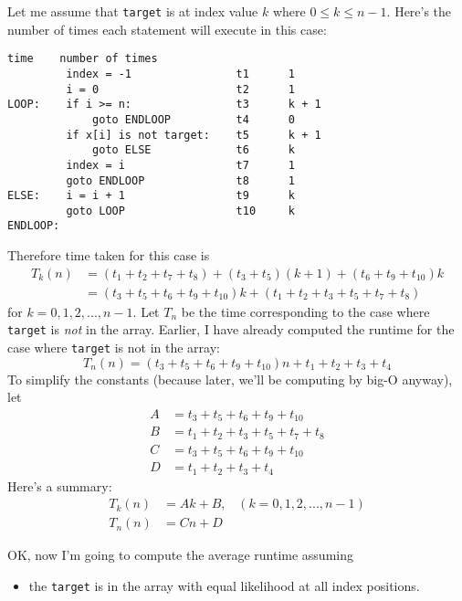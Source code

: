 Let me assume that \verb!target! is at index value $k$
where $0 \leq k \leq n - 1$.
Here's the number of times each statement will execute in this case:
\begin{Verbatim}[frame=single, fontsize=\footnotesize]
                                   time    number of times   
         index = -1                t1      1
         i = 0                     t2      1
LOOP:    if i >= n:                t3      k + 1
             goto ENDLOOP          t4      0
         if x[i] is not target:    t5      k + 1 
             goto ELSE             t6      k 
         index = i                 t7      1
         goto ENDLOOP              t8      1
ELSE:    i = i + 1                 t9      k
         goto LOOP                 t10     k
ENDLOOP:
\end{Verbatim}
Therefore time taken for this case is
\begin{align*}
T_k(n)
  &= (t_1 + t_2 + t_7 + t_8)
    + (t_3 + t_5)(k + 1)
    + (t_6 + t_9 + t_{10})k \\
  &= (t_3 + t_5 + t_6 + t_9 + t_{10}) k
    + (t_1 + t_2 + t_3 + t_5 + t_7 + t_8)
\end{align*}
for $k = 0, 1, 2, ..., n - 1$.
Let $T_n$ be the time corresponding to the case where
\verb!target! is \textit{not} in the array.
Earlier, I have already computed the runtime for the case where 
\verb!target! is not in the array:
\[
  T_n(n) =
  (t_3 + t_5 + 
    t_6  + 
    t_9 +
    t_{10}
    )n
    +
    t_1 + 
    t_2 + 
    t_3 + 
    t_4
\]
To simplify the constants 
(because later, we'll be computing by big-O anyway),
let
\begin{align*}
A &= t_3 + t_5 + t_6 + t_9 + t_{10} \\
B &= t_1 + t_2 + t_3 + t_5 + t_7 + t_8 \\
C &= t_3 + t_5 + 
    t_6  + 
    t_9 +
    t_{10} \\
D &= t_1 + 
    t_2 + 
    t_3 + 
    t_4
\end{align*}
Here's a summary:
\begin{align*}
T_k(n) &= Ak + B, \,\,\,\,\,(k = 0, 1, 2,..., n - 1) \\
T_n(n) &= Cn + D
\end{align*}

OK, now I'm going to compute the average runtime
assuming 
\begin{itemize}
\item the \verb!target! is in the array with equal likelihood
at all index positions.
\end{itemize}

